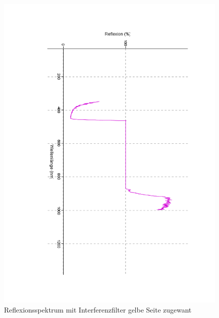 \documentclass[12pt,a4paper]{article}
\begin{document}
\begin{figure}[H]
	\centering
	\includegraphics[scale=0.5,angle = 90,trim = 20mm 20mm 20mm 20mm]{./data/Spektro/Interferenzfilter_Gelb.pdf}
	\caption{Reflexionsspektrum mit Interferenzfilter gelbe Seite zugewant}
	\label{fig:InterferenzGelb}
\end{figure}
\end{document}
